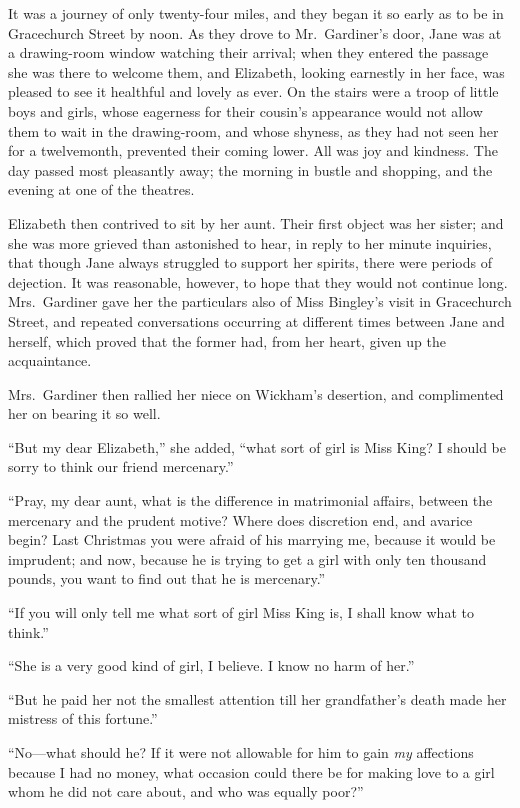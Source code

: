 It was a journey of only twenty-four miles, and they began it so
early as to be in Gracechurch Street by noon.  As they drove
to Mr.\ Gardiner's door, Jane was at a drawing-room window
watching their arrival; when they entered the passage she was
there to welcome them, and Elizabeth, looking earnestly in her
face, was pleased to see it healthful and lovely as ever.  On the
stairs were a troop of little boys and girls, whose eagerness for
their cousin's appearance would not allow them to wait in the
drawing-room, and whose shyness, as they had not seen her for
a twelvemonth, prevented their coming lower.  All was joy and
kindness.  The day passed most pleasantly away; the morning in
bustle and shopping, and the evening at one of the theatres.

Elizabeth then contrived to sit by her aunt.  Their first object was
her sister; and she was more grieved than astonished to hear, in
reply to her minute inquiries, that though Jane always struggled
to support her spirits, there were periods of dejection.  It was
reasonable, however, to hope that they would not continue long.
Mrs.\ Gardiner gave her the particulars also of Miss Bingley's
visit in Gracechurch Street, and repeated conversations
occurring at different times between Jane and herself, which
proved that the former had, from her heart, given up the
acquaintance.

Mrs.\ Gardiner then rallied her niece on  Wickham's desertion,
and complimented her on bearing it so well.

``But my dear Elizabeth,'' she added, ``what sort of girl is Miss
King?  I should be sorry to think our friend mercenary.''

``Pray, my dear aunt, what is the difference in matrimonial
affairs, between the mercenary and the prudent motive?  Where
does discretion end, and avarice begin?  Last Christmas you
were afraid of his marrying me, because it would be imprudent;
and now, because he is trying to get a girl with only ten
thousand pounds, you want to find out that he is mercenary.''

``If you will only tell me what sort of girl Miss King is, I shall
know what to think.''

``She is a very good kind of girl, I believe.  I know no harm of
her.''

``But he paid her not the smallest attention till her grandfather's
death made her mistress of this fortune.''

``No---what should he?  If it were not allowable for him to gain
\emph{my} affections because I had no money, what occasion could
there be for making love to a girl whom he did not care about,
and who was equally poor?''

